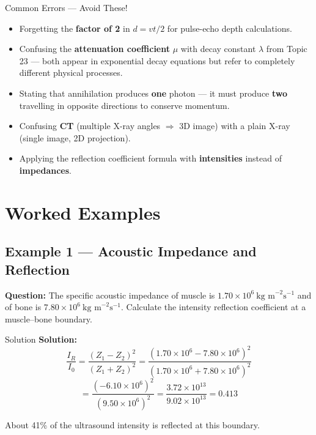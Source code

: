 \begin{warningbox}{Common Errors — Avoid These!}
\begin{itemize}[itemsep=3pt]
  \item Forgetting the \textbf{factor of 2} in $d = vt/2$ for pulse-echo depth calculations.
  \item Confusing the \textbf{attenuation coefficient} $\mu$ with decay constant $\lambda$ from Topic 23 — both appear in exponential decay equations but refer to completely different physical processes.
  \item Stating that annihilation produces \textbf{one} photon — it must produce \textbf{two} travelling in opposite directions to conserve momentum.
  \item Confusing \textbf{CT} (multiple X-ray angles $\Rightarrow$ 3D image) with a plain X-ray (single image, 2D projection).
  \item Applying the reflection coefficient formula with \textbf{intensities} instead of \textbf{impedances}.
\end{itemize}
\end{warningbox}

\section{Worked Examples}

\subsection*{Example 1 — Acoustic Impedance and Reflection}

\textbf{Question:} The specific acoustic impedance of muscle is $1.70\times10^6\ \text{kg m}^{-2}\text{s}^{-1}$ and of bone is $7.80\times10^6\ \text{kg m}^{-2}\text{s}^{-1}$. Calculate the intensity reflection coefficient at a muscle--bone boundary.

\begin{examplebox}{Solution}
\textbf{Solution:}\\
$$\frac{I_R}{I_0} = \frac{(Z_1-Z_2)^2}{(Z_1+Z_2)^2} = \frac{(1.70\times10^6 - 7.80\times10^6)^2}{(1.70\times10^6 + 7.80\times10^6)^2}$$
$$= \frac{(-6.10\times10^6)^2}{(9.50\times10^6)^2} = \frac{3.72\times10^{13}}{9.02\times10^{13}} = \mathbf{0.413}$$

About 41\% of the ultrasound intensity is reflected at this boundary.
\end{examplebox}

